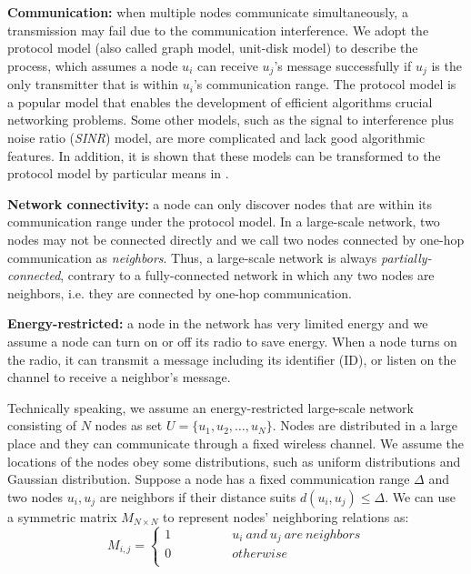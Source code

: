 \textbf{Communication:}
when multiple nodes communicate simultaneously, a transmission may fail due to the communication interference. We adopt the protocol model (also called graph model, unit-disk model\cite{moscibroda2006complexity, wang2015connectivity}) to describe the process, which assumes a node $u_i$ can receive $u_j$'s message successfully if $u_j$ is the only transmitter that is within $u_i$'s communication range.
The protocol model is a popular model that enables the development of efficient algorithms crucial networking problems. Some other models, such as the signal to interference plus noise ratio (\emph{SINR}) model, are more complicated and lack good algorithmic features. In addition, it is shown that these models can be transformed to the protocol model by particular means in \cite{lebhar2009unit}.

\textbf{Network connectivity:}
a node can only discover nodes that are within its communication range under the protocol model. In a large-scale network, two nodes may not be connected directly and we call two nodes connected by one-hop communication as \emph{neighbors}. Thus, a large-scale network is always \emph{partially-connected}, contrary to a fully-connected network in which any two nodes are neighbors, i.e. they are connected by one-hop communication.


\textbf{Energy-restricted:}
a node in the network has very limited energy and we assume a node can turn on or off its radio to save energy. When a node turns on the radio, it can transmit a message including its identifier (ID), or listen on the channel to receive a neighbor's message.

Technically speaking, we assume an energy-restricted large-scale network consisting of $N$ nodes as set $U=\{u_1,u_2,\ldots,u_N\}$.  Nodes are distributed in a large place and they can communicate through a fixed wireless channel. We assume the locations of the nodes obey some distributions, such as uniform distributions and Gaussian distribution\cite{wang2013gaussian}.
Suppose a node has a fixed communication range $\Delta$ and two nodes $u_i, u_j$ are neighbors if their distance suits $d(u_i, u_j) \leq \Delta$. We can use a symmetric matrix $M_{N\times N}$ to represent nodes' neighboring relations as:
$$ M_{i,j}=\left\{
\begin{aligned}
1  & & & & & & {u_i ~and~ u_j ~are~ neighbors}\\
0  & & & & & & {otherwise}\\
\end{aligned}
\right.
$$



